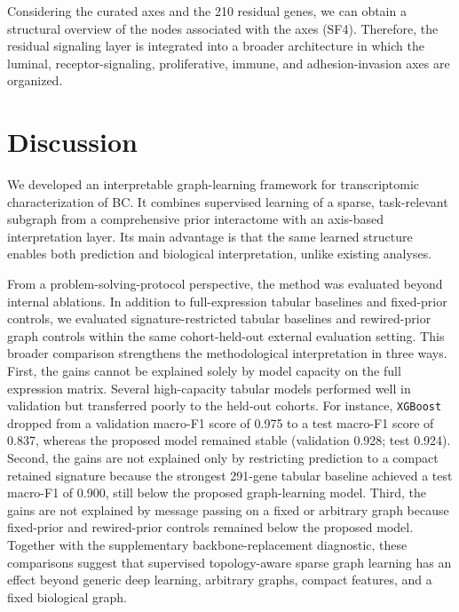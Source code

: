 \documentclass[unnumsec,webpdf,modern,large]{oup-authoring-template}
\begin{document}
Considering the curated axes and the 210 residual genes, we can obtain a structural overview of the nodes associated with the axes (SF4). Therefore, the residual signaling layer is integrated into a broader architecture in which the luminal, receptor-signaling, proliferative, immune, and adhesion-invasion axes are organized.

\newpage
\section{Discussion}

We developed an interpretable graph-learning framework for transcriptomic characterization of BC. It combines supervised learning of a sparse, task-relevant subgraph from a comprehensive prior interactome with an axis-based interpretation layer. Its main advantage is that the same learned structure enables both prediction and biological interpretation, unlike existing analyses.

From a problem-solving-protocol perspective, the method was evaluated beyond internal ablations. In addition to full-expression tabular baselines and fixed-prior controls, we evaluated signature-restricted tabular baselines and rewired-prior graph controls within the same cohort-held-out external evaluation setting. This broader comparison strengthens the methodological interpretation in three ways. First, the gains cannot be explained solely by model capacity on the full expression matrix. Several high-capacity tabular models performed well in validation but transferred poorly to the held-out cohorts. For instance, \texttt{XGBoost} dropped from a validation macro-F1 score of 0.975 to a test macro-F1 score of 0.837, whereas the proposed model remained stable (validation 0.928; test 0.924). Second, the gains are not explained only by restricting prediction to a compact retained signature because the strongest 291-gene tabular baseline achieved a test macro-F1 of 0.900, still below the proposed graph-learning model. Third, the gains are not explained by message passing on a fixed or arbitrary graph because fixed-prior and rewired-prior controls remained below the proposed model. Together with the supplementary backbone-replacement diagnostic, these comparisons suggest that supervised topology-aware sparse graph learning has an effect beyond generic deep learning, arbitrary graphs, compact features, and a fixed biological graph.
\end{document}
